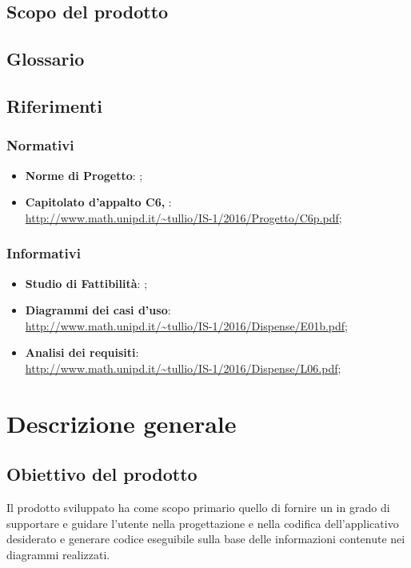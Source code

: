 	\subsection{Scopo del prodotto}
	\scopo{}
	
	\subsection{Glossario}
	\presgloss{}
	
	\subsection{Riferimenti}
		\subsubsection{Normativi}
		\begin{itemize}
			\item \textbf{Norme di Progetto}: \NdP;
			\item \textbf{Capitolato d'appalto C6, \proj}: \\
			\url{http://www.math.unipd.it/~tullio/IS-1/2016/Progetto/C6p.pdf};
		\end{itemize}
		
		\subsubsection{Informativi}
		\begin{itemize}
			\item \textbf{Studio di Fattibilità}: \SdF;
			\item \textbf{Diagrammi dei casi d'uso}: \\
			\url{http://www.math.unipd.it/~tullio/IS-1/2016/Dispense/E01b.pdf};
			\item \textbf{Analisi dei requisiti}: \\
			\url{http://www.math.unipd.it/~tullio/IS-1/2016/Dispense/L06.pdf};
		\end{itemize}



\section{Descrizione generale}
	\subsection{Obiettivo del prodotto}
	Il prodotto sviluppato ha come scopo primario quello di fornire un  in grado di supportare e guidare l'utente nella progettazione e nella codifica dell'applicativo desiderato e generare codice eseguibile sulla base delle informazioni contenute nei diagrammi realizzati. 

